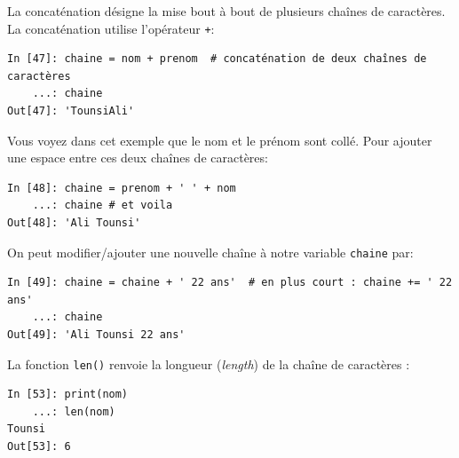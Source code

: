 \documentclass{beamer}
\begin{document}
\begin{frame}

La concaténation désigne la mise bout à bout de plusieurs chaînes de caractères.
La concaténation utilise l'opérateur \texttt{+}:
\begin{verbatim}
In [47]: chaine = nom + prenom  # concaténation de deux chaînes de caractères
    ...: chaine
Out[47]: 'TounsiAli'
\end{verbatim}
Vous voyez dans cet exemple que le nom et le prénom sont collé. Pour ajouter une espace entre ces deux chaînes de caractères:
\begin{verbatim}
In [48]: chaine = prenom + ' ' + nom
    ...: chaine # et voila
Out[48]: 'Ali Tounsi'
\end{verbatim}
\end{frame}

\begin{frame}

On peut modifier/ajouter une nouvelle chaîne à notre variable \texttt{chaine} par:
\begin{verbatim}
In [49]: chaine = chaine + ' 22 ans'  # en plus court : chaine += ' 22 ans'
    ...: chaine
Out[49]: 'Ali Tounsi 22 ans'
\end{verbatim}

La fonction \texttt{len()} renvoie la longueur (\emph{length}) de la chaîne de caractères :

\begin{verbatim}
In [53]: print(nom)
    ...: len(nom)
Tounsi
Out[53]: 6
\end{verbatim}
\end{frame}
\end{document}

